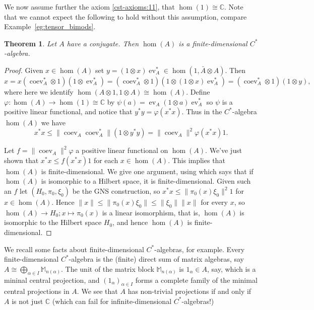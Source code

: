 \documentclass[a4paper,11pt]{article}
\theoremstyle{plain}
\newtheorem{theorem}[proposition]{Theorem}
\theoremstyle{remark}
\newcommand{\ev}{\operatorname{ev}}
\newcommand{\coev}{\operatorname{coev}}
\newcommand{\conj}[1]{\bar{#1}}
\begin{document}
We now assume further the axiom \ref{cst-axioms:11}, that $\hom(1)\cong\mathbb C$.  Note that we cannot expect the following to hold without this assumption, compare Example~\ref{eg:tensor_bimods}.

\begin{theorem}\label{thm:conj_implies_fd}
Let $A$ have a conjugate.  Then $\hom(A)$ is a finite-dimensional $C^*$-algebra.
\end{theorem}
\begin{proof}
Given $x\in\hom(A)$ set $y = (1\otimes x)\ev_A^* \in \hom(1, \conj{A}\otimes A)$.  Then
\[ x = x (\coev_A^*\otimes 1)(1\otimes\ev_A^*) = 
(\coev_A^*\otimes 1)(1\otimes (1\otimes x)\ev_A^*)
= (\coev_A^*\otimes 1)(1\otimes y), \]
where here we identify $\hom(A\otimes 1, 1\otimes A) \cong \hom(A)$.  Define $\varphi \colon \hom(A) \to \hom(1) \cong \mathbb C$ by $\psi(a) = \ev_A(1\otimes a)\ev_A^*$ so $\psi$ is a positive linear functional, and notice that $y^*y = \varphi(x^*x)$.  Thus in the $C^*$-algebra $\hom(A)$ we have
\[ x^*x \leq \|\coev_A \coev_A^*\| (1\otimes y^*y) = \|\coev_A\|^2 \varphi(x^*x) 1. \]

Let $f = \|\coev_A\|^2 \varphi$ a positive linear functional on $\hom(A)$.  We've just shown that $x^*x \leq f(x^*x)1$ for each $x\in\hom(A)$.  This implies that $\hom(A)$ is finite-dimensional.  We give one argument, using \cite[Corollary~1]{Sakai_wkly_cmpt_op_algs} which says that if $\hom(A)$ is isomorphic to a Hilbert space, it is finite-dimensional.  Given such an $f$ let $(H_0, \pi_0, \xi_0)$ be the GNS construction, so $x^*x \leq \|\pi_0(x)\xi_0\|^2 1$ for $x\in\hom(A)$.  Hence $\|x\| \leq \|\pi_0(x)\xi_0\| \leq \|\xi_0\| \|x\|$ for every $x$, so $\hom(A)\to H_0; x\mapsto \pi_0(x)$ is a linear isomorphism, that is, $\hom(A)$ is isomorphic to the Hilbert space $H_0$, and hence $\hom(A)$ is finite-dimensional.
\end{proof}

We recall some facts about finite-dimensional $C^*$-algebras, \cite[Section~I.11]{TakesakiI} for example.  Every finite-dimensional $C^*$-algebra is the (finite) direct sum of matrix algebras, say $A \cong \bigoplus_{\alpha \in I} \mathbb M_{n(\alpha)}$.  The unit of the matrix block $\mathbb M_{n(\alpha)}$ is $1_\alpha\in A$, say, which is a mininal central projection, and $(1_\alpha)_{\alpha\in I}$ forms a complete family of the minimal central projections in $A$.  We see that $A$ has non-trivial projections if and only if $A$ is not just $\mathbb C$ (which can fail for infinite-dimensional $C^*$-algebras!)  
\end{document}
